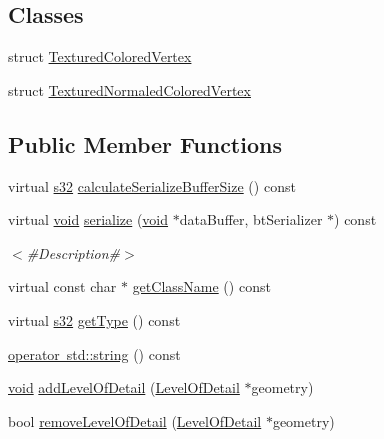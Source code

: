 \subsection*{Classes}
\begin{DoxyCompactItemize}
\item 
struct \mbox{\hyperlink{structnjli_1_1_geometry_1_1_textured_colored_vertex}{Textured\+Colored\+Vertex}}
\item 
struct \mbox{\hyperlink{structnjli_1_1_geometry_1_1_textured_normaled_colored_vertex}{Textured\+Normaled\+Colored\+Vertex}}
\end{DoxyCompactItemize}
\subsection*{Public Member Functions}
\begin{DoxyCompactItemize}
\item 
virtual \mbox{\hyperlink{_util_8h_aa62c75d314a0d1f37f79c4b73b2292e2}{s32}} \mbox{\hyperlink{classnjli_1_1_geometry_a8a14d6d068bf303718c1a92886f673b8}{calculate\+Serialize\+Buffer\+Size}} () const
\item 
virtual \mbox{\hyperlink{_thread_8h_af1e856da2e658414cb2456cb6f7ebc66}{void}} \mbox{\hyperlink{classnjli_1_1_geometry_a42a35911278eb52e0013d6dadd80271d}{serialize}} (\mbox{\hyperlink{_thread_8h_af1e856da2e658414cb2456cb6f7ebc66}{void}} $\ast$data\+Buffer, bt\+Serializer $\ast$) const
\begin{DoxyCompactList}\small\item\em $<$\#\+Description\#$>$ \end{DoxyCompactList}\item 
virtual const char $\ast$ \mbox{\hyperlink{classnjli_1_1_geometry_abfa3fe3b5680b7b40c650fdc7a7fb737}{get\+Class\+Name}} () const
\item 
virtual \mbox{\hyperlink{_util_8h_aa62c75d314a0d1f37f79c4b73b2292e2}{s32}} \mbox{\hyperlink{classnjli_1_1_geometry_ac13aedbb6914e12416c46574805cb13a}{get\+Type}} () const
\item 
\mbox{\hyperlink{classnjli_1_1_geometry_ae678ad91efebe665fc2f5533dc26fe24}{operator std\+::string}} () const
\item 
\mbox{\hyperlink{_thread_8h_af1e856da2e658414cb2456cb6f7ebc66}{void}} \mbox{\hyperlink{classnjli_1_1_geometry_a3cbdfa54d4321633f3c59c27a041fe52}{add\+Level\+Of\+Detail}} (\mbox{\hyperlink{classnjli_1_1_level_of_detail}{Level\+Of\+Detail}} $\ast$geometry)
\item 
bool \mbox{\hyperlink{classnjli_1_1_geometry_ae0001216bacc787a9c235fb78609d276}{remove\+Level\+Of\+Detail}} (\mbox{\hyperlink{classnjli_1_1_level_of_detail}{Level\+Of\+Detail}} $\ast$geometry)

\end{DoxyCompactItemize}
